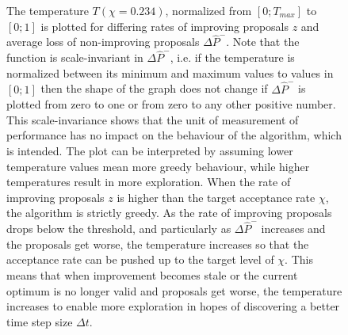 \documentclass[oneside, a4paper]{book}
\newcommand\br[1]{\left(#1\right)}
\begin{document}
    \begin{figure}
      \centering
      \caption{The temperature $T\br{\chi=0.234}$, normalized from $[0;T_{max}]$ to $[0;1]$ is plotted for differing rates of improving proposals $z$ and average loss of non-improving proposals $\Delta \hat{P}^-$. Note that the function is scale-invariant in $\Delta\hat{P}^-$, i.e. if the temperature is normalized between its minimum and maximum values to values in $[0;1]$ then the shape of the graph does not change if $\Delta\hat{P}^-$ is plotted from zero to one or from zero to any other positive number. This scale-invariance shows that the unit of measurement of performance has no impact on the behaviour of the algorithm, which is intended. 
      The plot can be interpreted by assuming lower temperature values mean more greedy behaviour, while higher temperatures result in more exploration. When the rate of improving proposals $z$ is higher than the target acceptance rate $\chi$, the algorithm is strictly greedy. As the rate of improving proposals drops below the threshold, and particularly as $\Delta \hat{P}^-$ increases and the proposals get worse, the temperature increases so that the acceptance rate can be pushed up to the target level of $\chi$. This means that when improvement becomes stale or the current optimum is no longer valid and proposals get worse, the temperature increases to enable more exploration in hopes of discovering a better time step size $\Delta t$.}
      \label{fig:temperature}
    \end{figure}
\end{document}
